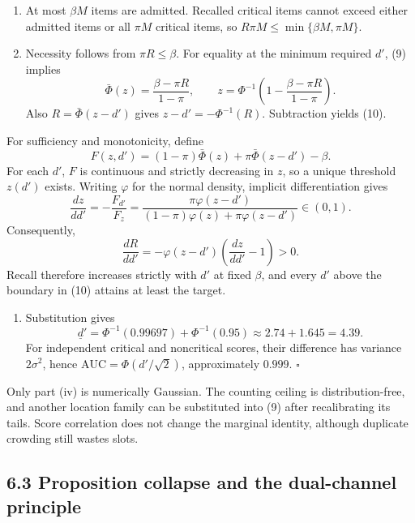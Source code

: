 \documentclass[
  11pt]{article}
\providecommand{\tightlist}{%
  \setlength{\itemsep}{0pt}\setlength{\parskip}{0pt}}
\begin{document}
\begin{enumerate}
\def\labelenumi{(\roman{enumi})}
\setcounter{enumi}{1}
\item
  At most \(\beta M\) items are admitted. Recalled critical items cannot exceed either admitted items or all \(\pi M\) critical items, so \(R\pi M\leq\min\{\beta M,\pi M\}\).
\item
  Necessity follows from \(\pi R\leq\beta\). For equality at the minimum required \(d'\), (9) implies \[
  \bar\Phi(z)=\frac{\beta-\pi R}{1-\pi},
  \qquad
  z=\Phi^{-1}\!\left(1-\frac{\beta-\pi R}{1-\pi}\right).
  \] Also \(R=\bar\Phi(z-d')\) gives \(z-d'=-\Phi^{-1}(R)\). Subtraction yields (10).
\end{enumerate}

For sufficiency and monotonicity, define \[
F(z,d')=(1-\pi)\bar\Phi(z)+\pi\bar\Phi(z-d')-\beta.
\] For each \(d'\), \(F\) is continuous and strictly decreasing in \(z\), so a unique threshold \(z(d')\) exists. Writing \(\varphi\) for the normal density, implicit differentiation gives \[
\frac{dz}{dd'}=-\frac{F_{d'}}{F_z}
=\frac{\pi\varphi(z-d')}{(1-\pi)\varphi(z)+\pi\varphi(z-d')}\in(0,1).
\] Consequently, \[
\frac{dR}{dd'}=-\varphi(z-d')\left(\frac{dz}{dd'}-1\right)>0.
\] Recall therefore increases strictly with \(d'\) at fixed \(\beta\), and every \(d'\) above the boundary in (10) attains at least the target.

\begin{enumerate}
\def\labelenumi{(\roman{enumi})}
\setcounter{enumi}{3}
\tightlist
\item
  Substitution gives \[
  \underline d'=\Phi^{-1}(0.99697)+\Phi^{-1}(0.95)
  \approx2.74+1.645=4.39.
  \] For independent critical and noncritical scores, their difference has variance \(2\sigma^2\), hence \(\mathrm{AUC}=\Phi(d'/\sqrt2)\), approximately \(0.999\). \(\square\)
\end{enumerate}

Only part (iv) is numerically Gaussian. The counting ceiling is distribution-free, and another location family can be substituted into (9) after recalibrating its tails. Score correlation does not change the marginal identity, although duplicate crowding still wastes slots.

\subsection{6.3 Proposition collapse and the dual-channel principle}\label{proposition-collapse-and-the-dual-channel-principle}
\end{document}
